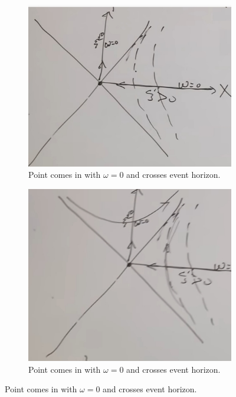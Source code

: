 \documentclass[]{article}
\begin{document}
{\begin{figure}[H]
	\caption{Crossing the event horizon}
	\begin{subfigure}[t]{0.3\textwidth}
		\caption{Point comes in with $\omega=0$ and crosses event horizon.}\label{fig:gr-6-cross-event-horizon}
		\includegraphics[width=\textwidth]{gr-6-cross-event-horizon}
	\end{subfigure}
	\begin{subfigure}[t]{0.3\textwidth}
		\caption{Point comes in with $\omega=0$ and crosses event horizon.}\label{fig:gr-6-cross-event-horizon-omega}
		\includegraphics[width=\textwidth]{gr-6-cross-event-horizon-omega}

\end{subfigure}
\end{figure}}
\end{document}
